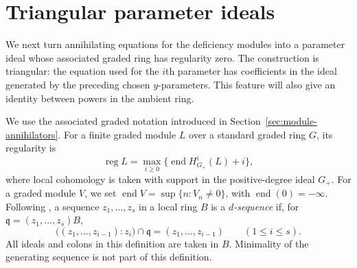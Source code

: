 \documentclass[11pt,reqno]{amsart}
\numberwithin{equation}{section}
\theoremstyle{definition}
\begin{document}
\section{Triangular parameter ideals}\label{sec:parameters}

We next turn annihilating equations for the deficiency modules into a
parameter ideal whose associated graded ring has regularity zero.  The
construction is triangular: the equation used for the $i$th parameter has
coefficients in the ideal generated by the preceding chosen $y$-parameters. This
feature will also give an identity between powers in the ambient ring.

We use the associated graded notation introduced in
Section~\ref{sec:module-annihilators}. For a finite graded module $L$
over a standard graded ring $G$, its regularity is
\[
 \operatorname{reg}L
 =\max_{i\ge0}\{\operatorname{end}H^i_{G_+}(L)+i\},
\]
where local cohomology is taken with support in the positive-degree
ideal $G_+$. For a graded module $V$, we set
$\operatorname{end}V=\sup\{n:V_n\ne0\}$, with
$\operatorname{end}(0)=-\infty$.
Following \cite[Section~5]{Trung1998}, a sequence
$z_1,\ldots,z_s$ in a local ring $B$ is a \emph{$d$-sequence} if, for
$\mathfrak q=(z_1,\ldots,z_s)B$,
\begin{equation}\label{eq:dsequence-definition}
 \bigl((z_1,\ldots,z_{i-1}):z_i\bigr)\cap\mathfrak q
 =(z_1,\ldots,z_{i-1})\qquad(1\leq i\leq s).
\end{equation}
All ideals and colons in this definition are taken in $B$.
Minimality of the generating sequence is not part of this definition.
\end{document}
